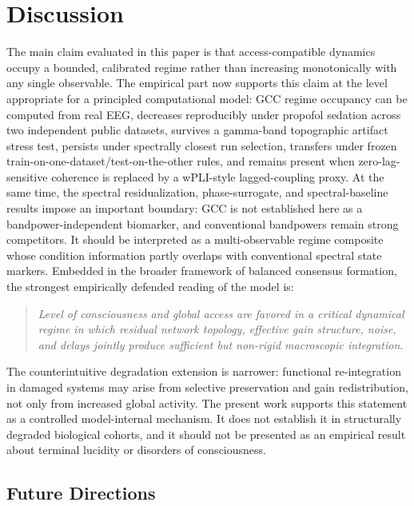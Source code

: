 \documentclass[11pt,a4paper]{article}
\theoremstyle{plain}
\theoremstyle{definition}
\theoremstyle{remark}
\begin{document}
\section{Discussion}
\label{sec:diskussion}

The main claim evaluated in this paper is that access-compatible dynamics occupy a bounded, calibrated regime rather than increasing monotonically with any single observable. The empirical part now supports this claim at the level appropriate for a principled computational model: GCC regime occupancy can be computed from real EEG, decreases reproducibly under propofol sedation across two independent public datasets, survives a gamma-band topographic artifact stress test, persists under spectrally closest run selection, transfers under frozen train-on-one-dataset/test-on-the-other rules, and remains present when zero-lag-sensitive coherence is replaced by a wPLI-style lagged-coupling proxy. At the same time, the spectral residualization, phase-surrogate, and spectral-baseline results impose an important boundary: GCC is not established here as a bandpower-independent biomarker, and conventional bandpowers remain strong competitors. It should be interpreted as a multi-observable regime composite whose condition information partly overlaps with conventional spectral state markers. Embedded in the broader framework of balanced consensus formation, the strongest empirically defended reading of the model is:

\begin{quote}
\itshape
Level of consciousness and global access are favored in a critical dynamical regime in which residual network topology, effective gain structure, noise, and delays jointly produce sufficient but non-rigid macroscopic integration.
\end{quote}

The counterintuitive degradation extension is narrower: functional re-integration in damaged systems may arise from selective preservation and gain redistribution, not only from increased global activity. The present work supports this statement as a controlled model-internal mechanism. It does not establish it in structurally degraded biological cohorts, and it should not be presented as an empirical result about terminal lucidity or disorders of consciousness.

\subsection{Future Directions}
\label{sec:future-directions}
\end{document}
